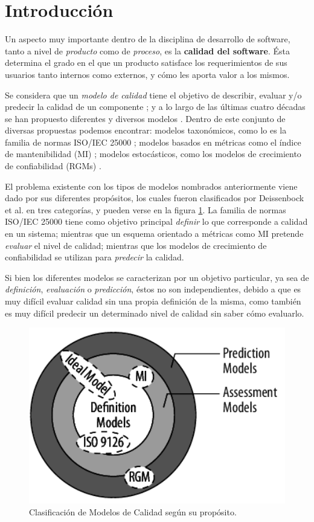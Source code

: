 \section{Introducción}

Un aspecto muy importante dentro de la disciplina de desarrollo de software, tanto
a nivel de \textit{producto} como de \textit{proceso}, es la \textbf{calidad del
software}.
Ésta determina el grado en el que un producto satisface los requerimientos de sus usuarios
tanto internos como externos, y cómo les aporta valor a los mismos.

Se considera que un \textit{modelo de calidad} tiene el objetivo de describir, evaluar y/o
predecir la calidad de un componente \cite{Wagner2013}; y a lo largo de las últimas cuatro
décadas se han propuesto diferentes y diversos modelos \cite{Deissenboeck2009}.
Dentro de este conjunto de diversas propuestas podemos encontrar: modelos taxonómicos, como
lo es la familia de normas ISO/IEC 25000 \cite{ref}; modelos basados en métricas como el
índice de mantenibilidad (MI) \cite{ref}; modelos estocásticos, como los modelos de crecimiento
de confiabilidad (RGMs) \cite{ref}.

El problema existente con los tipos de modelos nombrados anteriormente viene dado por sus
diferentes propósitos, los cuales fueron clasificados por Deissenbock et al. \cite{Deissenboeck2009}
en tres categorías, y pueden verse en la figura \ref{DAPModels}.
La familia de normas ISO/IEC 25000 tiene como objetivo principal \textit{definir} lo que
corresponde a calidad en un sistema; mientras que un esquema orientado a métricas como MI
pretende \textit{evaluar} el nivel de calidad; mientras que los modelos de crecimiento de
confiabilidad se utilizan para \textit{predecir} la calidad.

Si bien los diferentes modelos se caracterizan por un objetivo particular, ya sea de
\textit{definición}, \textit{evaluación} o \textit{predicción}, éstos no son independientes,
debido a que es muy difícil evaluar calidad sin una propia definición de la misma, como también
es muy difícil predecir un determinado nivel de calidad sin saber cómo evaluarlo.

\begin{figure}
    \label{DAPModels}
    \includegraphics[width=12cm]{quality_metrics/dap_models.png}
    \centering
    \caption{Clasificación de Modelos de Calidad según su propósito.}
\end{figure}

